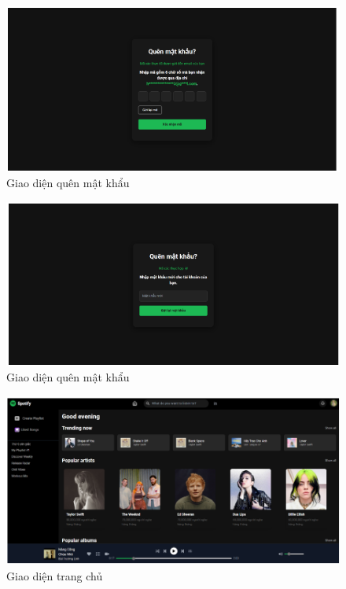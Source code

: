 \begin{figure}
    \centering
    \includegraphics[width=1\linewidth]{images/ui-forgot1.png}
    \caption{Giao diện quên mật khẩu}
    \label{fig:ui-forgot1}
\end{figure}

\begin{figure}
    \centering
    \includegraphics[width=1\linewidth]{images/ui-forgot2.png}
    \caption{Giao diện quên mật khẩu}
    \label{fig:ui-forgot2}
\end{figure}

\begin{figure}
    \centering
    \includegraphics[width=1\linewidth]{images/ui-homepage.png}
    \caption{Giao diện trang chủ}
    \label{fig:ui-homepage}
\end{figure}

